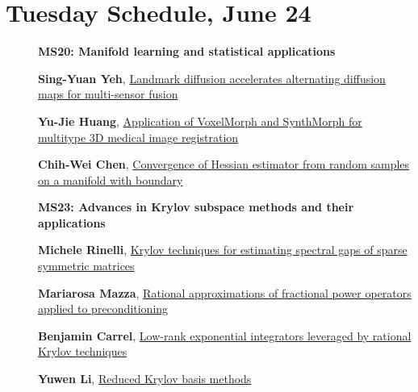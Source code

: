 \documentclass[ILAS2025-program.tex]{subfiles}
\begin{document}
\section*{Tuesday Schedule, June 24 }
        
        \begin{description}
    \item[] {\color{mstitle}\textbf{MS20: Manifold learning and statistical applications}} 
    \item[] \hypertarget{up0150}{}\textbf{Sing-Yuan Yeh}, \hyperlink{down0150}{Landmark diffusion accelerates alternating diffusion maps for multi-sensor fusion}
        \item[] \hypertarget{up0151}{}\textbf{Yu-Jie Huang}, \hyperlink{down0151}{Application of VoxelMorph and SynthMorph for multitype 3D medical image registration}
        \item[] \hypertarget{up0152}{}\textbf{Chih-Wei Chen}, \hyperlink{down0152}{Convergence of Hessian estimator from random samples on a manifold with boundary}
        \end{description}
    \begin{description}
    \item[] {\color{mstitle}\textbf{MS23: Advances in Krylov subspace methods and their applications}} 
    \item[] \hypertarget{up0193}{}\textbf{Michele Rinelli}, \hyperlink{down0193}{Krylov techniques for estimating spectral gaps of sparse symmetric matrices}
        \item[] \hypertarget{up0194}{}\textbf{Mariarosa Mazza}, \hyperlink{down0194}{Rational approximations of fractional power operators applied to preconditioning}
        \item[] \hypertarget{up0195}{}\textbf{Benjamin Carrel}, \hyperlink{down0195}{Low-rank exponential integrators leveraged by rational Krylov techniques
}
        \item[] \hypertarget{up0196}{}\textbf{Yuwen Li}, \hyperlink{down0196}{Reduced Krylov basis methods}
        \end{description}
\end{document}
